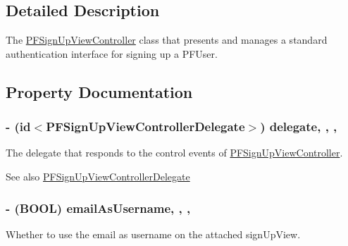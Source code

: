 \subsection{Detailed Description}
The {\ttfamily \hyperlink{interface_p_f_sign_up_view_controller}{P\+F\+Sign\+Up\+View\+Controller}} class that presents and manages a standard authentication interface for signing up a {\ttfamily P\+F\+User}. 

\subsection{Property Documentation}
\hypertarget{interface_p_f_sign_up_view_controller_a1150c82d22998c1f83f712e1e60a386a}{}
\subsubsection[{delegate}]{\setlength{\rightskip}{0pt plus 5cm}-\/ (id$<${\bf P\+F\+Sign\+Up\+View\+Controller\+Delegate}$>$) delegate\hspace{0.3cm}{\ttfamily [read]}, {\ttfamily [write]}, {\ttfamily [nonatomic]}, {\ttfamily [weak]}}\label{interface_p_f_sign_up_view_controller_a1150c82d22998c1f83f712e1e60a386a}
The delegate that responds to the control events of {\ttfamily \hyperlink{interface_p_f_sign_up_view_controller}{P\+F\+Sign\+Up\+View\+Controller}}.

\begin{DoxySeeAlso}{See also}
\hyperlink{protocol_p_f_sign_up_view_controller_delegate-p}{P\+F\+Sign\+Up\+View\+Controller\+Delegate} 
\end{DoxySeeAlso}
\hypertarget{interface_p_f_sign_up_view_controller_a90fe2f50758438dcc328bb9833ba6922}{}
\subsubsection[{email\+As\+Username}]{\setlength{\rightskip}{0pt plus 5cm}-\/ (B\+O\+O\+L) email\+As\+Username\hspace{0.3cm}{\ttfamily [read]}, {\ttfamily [write]}, {\ttfamily [nonatomic]}, {\ttfamily [assign]}}\label{interface_p_f_sign_up_view_controller_a90fe2f50758438dcc328bb9833ba6922}
Whether to use the email as username on the attached {\ttfamily sign\+Up\+View}.


